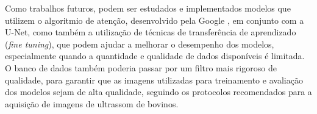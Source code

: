 Como trabalhos futuros, podem ser estudados e implementados modelos que utilizem o algoritmio de atenção, desenvolvido pela Google \cite{Vaswani2017}, em conjunto com a U-Net, como também a utilização de técnicas de transferência de aprendizado (\textit{fine tuning}), que podem ajudar a melhorar o desempenho dos modelos, especialmente quando a quantidade e qualidade de dados disponíveis é limitada. O banco de dados também poderia passar por um filtro mais rigoroso de qualidade, para garantir que as imagens utilizadas para treinamento e avaliação dos modelos sejam de alta qualidade, seguindo os protocolos recomendados para a aquisição de imagens de ultrassom de bovinos.   

